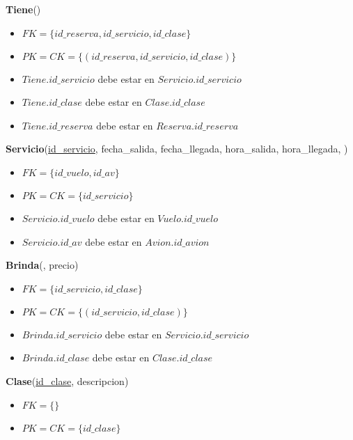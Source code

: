 \vspace*{0.1cm}
\noindent
\textbf{Tiene}(\underline{})
\begin{itemize}[noitemsep]
	\item $FK = \{id\_reserva, id\_servicio, id\_clase\}$
	\item $PK = CK = \{(id\_reserva, id\_servicio, id\_clase)\}$
	\item $Tiene.id\_servicio$ debe estar en $Servicio.id\_servicio$
	\item $Tiene.id\_clase$ debe estar en $Clase.id\_clase$
	\item $Tiene.id\_reserva$ debe estar en $Reserva.id\_reserva$
\end{itemize}

\vspace*{0.1cm}
\noindent
\textbf{Servicio}(\underline{id\_servicio}, fecha\_salida, fecha\_llegada,
		hora\_salida, hora\_llegada, )
\begin{itemize}[noitemsep]
	\item $FK = \{id\_vuelo, id\_av\}$
	\item $PK = CK = \{id\_servicio\}$
	\item $Servicio.id\_vuelo$ debe estar en $Vuelo.id\_vuelo$
	\item $Servicio.id\_av$ debe estar en $Avion.id\_avion$
\end{itemize}

\vspace*{0.1cm}
\noindent
\textbf{Brinda}(\underline{}, precio)
\begin{itemize}[noitemsep]
	\item $FK = \{id\_servicio, id\_clase\}$
	\item $PK = CK = \{(id\_servicio, id\_clase)\}$
	\item $Brinda.id\_servicio$ debe estar en $Servicio.id\_servicio$
	\item $Brinda.id\_clase$ debe estar en $Clase.id\_clase$
\end{itemize}

\vspace*{0.1cm}
\noindent
\textbf{Clase}(\underline{id\_clase}, descripcion)
\begin{itemize}[noitemsep]
	\item $FK = \{\}$
	\item $PK = CK = \{id\_clase\}$
\end{itemize}



